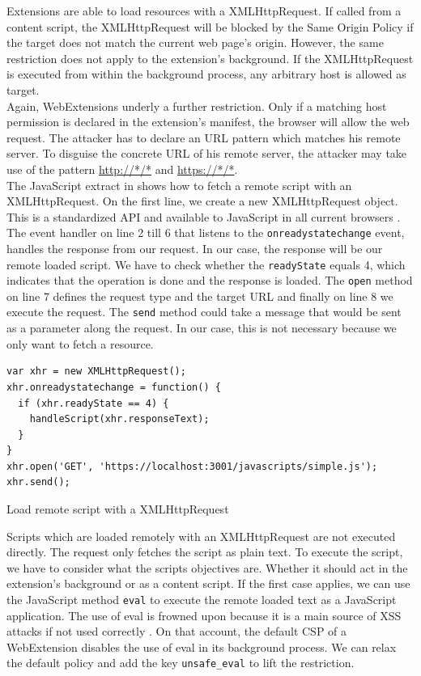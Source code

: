 			Extensions are able to load resources with a XMLHttpRequest. If called from a content script, the XMLHttpRequest will be blocked by the Same Origin Policy if the target does not match the current web page's origin. However, the same restriction does not apply to the extension's background. If the XMLHttpRequest is executed from within the background process, any arbitrary host is allowed as target. \\
			Again, WebExtensions underly a further restriction. Only if a matching host permission is declared in the extension's manifest, the browser will allow the web request. The attacker has to declare an URL pattern which matches his remote server. To disguise the concrete URL of his remote server, the attacker may take use of the pattern \url{http://*/*} and \url{https://*/*}. \\
			The JavaScript extract in  shows how to fetch a remote script with an XMLHttpRequest. On the first line, we create a new XMLHttpRequest object. This is a standardized API and available to JavaScript in all current browsers \cite{w3cXMLHttpRequest}. The event handler on line 2 till 6 that listens to the \texttt{onreadystatechange} event, handles the response from our request. In our case, the response will be our remote loaded script. We have to check whether the \texttt{readyState} equals 4, which indicates that the operation is done and the response is loaded. The \texttt{open} method on line 7 defines the request type and the target URL and finally on line 8 we execute the request. The \texttt{send} method could take a message that would be sent as a parameter along the request. In our case, this is not necessary because we only want to fetch a resource. 
			
			\begin{code}
				\begin{lstlisting}
var xhr = new XMLHttpRequest();
xhr.onreadystatechange = function() {
  if (xhr.readyState == 4) {
    handleScript(xhr.responseText);
  }
}
xhr.open('GET', 'https://localhost:3001/javascripts/simple.js');
xhr.send();
				\end{lstlisting}
				\caption{Load remote script with a XMLHttpRequest}
				\label{xhrLoadScript}
			\end{code}
			
			Scripts which are loaded remotely with an XMLHttpRequest are not executed directly. The request only fetches the script as plain text. To execute the script, we have to consider what the scripts objectives are. Whether it should act in the extension's background or as a content script. If the first case applies, we can use the JavaScript method \texttt{eval} to execute the remote loaded text as a JavaScript application. The use of eval is frowned upon because it is a main source of XSS attacks if not used correctly \cite{mozillaDangerousEval}. On that account, the default CSP of a WebExtension disables the use of eval in its background process. We can relax the default policy and add the key \texttt{unsafe\_eval} to lift the restriction. \\
			
